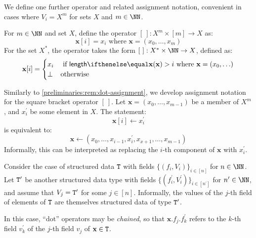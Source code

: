 We define one further operator and related assignment notation, convenient in cases where $V_i = X^m$ for sets $X$ and $m \in \NN$.
\begin{definition}\label{def:squareb-operator}
  For $m \in \NN$ and set $X$, define the operator $[\ ] : X^m \times [m] \to X$ as:
  \[
    \mathbf{x}[i] = x_i \text{ where } \mathbf{x} = (x_0, \ldots, x_m)
  \]
  For the set $X^*$, the operator takes the form $[\ ] : X^* \times \NN \to X$, defined as:
  \[
    \mathbf{x}[i] =
    \begin{cases}
        x_i & \text{ if } \len{\mathbf{x}} > i \text{ where } \mathbf{x} = (x_0, \ldots) \\
        \bot & \text{otherwise}
    \end{cases}
  \]
\end{definition}

\begin{remark}
  Similarly to \cref{preliminaries:rem:dot-assignment}, we develop assignment notation for the square bracket operator $[\ ]$.
  Let $\mathbf{x} = (x_0, \ldots, x_{m-1})$ be a member of $X^m$, and $x_i^\prime$ be some element in $X$. The statement:
  \[
    \mathbf{x}[i] \gets x_i^\prime
  \]
  is equivalent to:
  \[
    \mathbf{x} \gets (x_0, \ldots, x_{i-1}, x_i^\prime, x_{x+1}, \ldots, x_{m-1})
  \]
  Informally, this can be interpreted as replacing the $i$-th component of $\mathbf{x}$ with $x_i^\prime$.
\end{remark}

\begin{remark}
Consider the case of structured data ${\mathtt{T}}$ with fields $\{(f_i, V_i)\}_{i \in [n]}$ for $n \in \NN$. Let ${\mathtt{T^\prime}}$ be another structured data type with fields $\{(f^\prime_i, V^\prime_i)\}_{i \in [n^\prime]}$ for $n^\prime \in \NN$, and assume that $V_j = {\mathtt{T^\prime}}$ for some $j \in [n]$. Informally, the values of the $j$-th field of elements of ${\mathtt{T}}$ are themselves structured data of type ${\mathtt{T^\prime}}$.

In this case, ``dot'' operators may be \emph{chained}, so that $\mathbf{x}.f_j.f^\prime_k$ refers to the $k$-th field $v^\prime_k$ of the $j$-th field $v_j$ of $\mathbf{x} \in {\mathtt{T}}$.
\end{remark}


